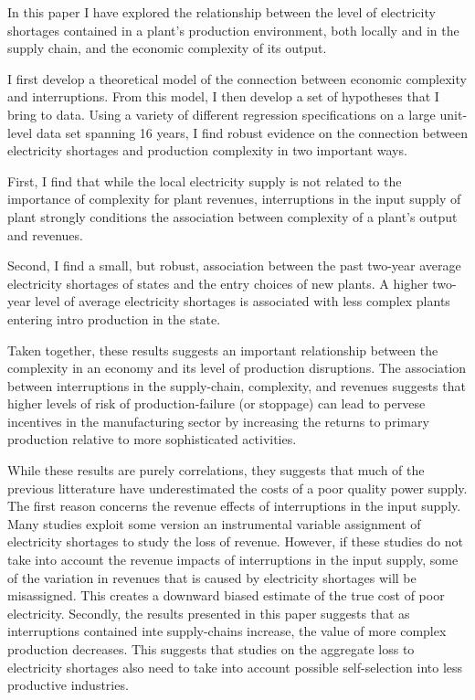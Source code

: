 \documentclass[11pt]{article}
\begin{document}
In this paper I have explored the relationship between the level of electricity shortages contained in a plant's production environment, both locally and in the supply chain, and the economic complexity of its output.

I first develop a theoretical model of the connection between economic complexity and interruptions. From this model, I then develop a set of hypotheses that I bring to data. Using a variety of different regression specifications on a large unit-level data set spanning 16 years, I find robust evidence on the connection between electricity shortages and production complexity in two important ways.

First, I find that while the local electricity supply is not related to the importance of complexity for plant revenues, interruptions in the input supply of plant strongly conditions the association between complexity of a plant's output and revenues.

Second, I find a small, but robust, association between the past two-year average electricity shortages of states and the entry choices of new plants. A higher two-year level of average electricity shortages is associated with less complex plants entering intro production in the state. 

Taken together, these results suggests an important relationship between the complexity in an economy and its level of production disruptions. The association between interruptions in the supply-chain, complexity, and revenues suggests that higher levels of risk of production-failure (or stoppage) can lead to pervese incentives in the manufacturing sector by increasing the returns to primary production relative to more sophisticated activities. 

While these results are purely correlations, they suggests that much of the previous litterature have underestimated the costs of a poor quality power supply. The first reason concerns the revenue effects of interruptions in the input supply. Many studies exploit some version an instrumental variable assignment of electricity shortages to study the loss of revenue. However, if these studies do not take into account the revenue impacts of interruptions in the input supply, some of the variation in revenues that is caused by electricity shortages will be misassigned. This creates a downward biased estimate of the true cost of poor electricity. Secondly, the results presented in this paper suggests that as interruptions contained inte supply-chains increase, the value of more complex production decreases. This suggests that studies on the aggregate loss to electricity shortages also need to take into account possible self-selection into less productive industries.
\end{document}
